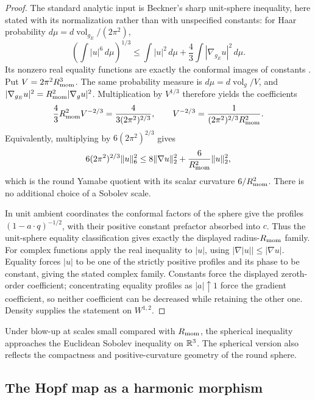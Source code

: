 \documentclass[11pt]{article}
\begin{document}
\begin{proof}
The standard analytic input is Beckner's sharp unit-sphere inequality,
here stated with its normalization rather than with unspecified constants:
for Haar probability \(d\mu=d\operatorname{vol}_{g_E}/(2\pi^2)\),
\[
 \left(\int |u|^6\,d\mu\right)^{1/3}
 \le \int |u|^2\,d\mu
       +\frac43\int |\nabla_{g_E}u|^2\,d\mu.
\]
Its nonzero real equality functions are exactly the conformal images of
constants \cite{beckner1993sharp}.  Put
\(V=2\pi^2R_{\mathrm{mom}}^3\).  The same probability measure is
\(d\mu=d\operatorname{vol}_g/V\), and
\(|\nabla_{g_E}u|^2=R_{\mathrm{mom}}^2|\nabla_gu|^2\).  Multiplication by \(V^{1/3}\)
therefore yields the coefficients
\[
 \frac43R_{\mathrm{mom}}^2V^{-2/3}
 =\frac4{3(2\pi^2)^{2/3}},\qquad
 V^{-2/3}=\frac1{(2\pi^2)^{2/3}R_{\mathrm{mom}}^2}.
\]
Equivalently, multiplying by \(6(2\pi^2)^{2/3}\) gives
\[
 6(2\pi^2)^{2/3}\|u\|_6^2
 \le8\|\nabla u\|_2^2+\frac6{R_{\mathrm{mom}}^2}\|u\|_2^2,
\]
which is the round Yamabe quotient with its scalar curvature \(6/R_{\mathrm{mom}}^2\).
There is no additional choice of a Sobolev scale.

In unit ambient coordinates the conformal factors of the sphere give the
profiles \((1-a\cdot q)^{-1/2}\), with their positive constant prefactor
absorbed into \(c\).  Thus the unit-sphere equality classification gives
exactly the displayed radius-\(R_{\mathrm{mom}}\) family.  For complex functions apply
the real inequality to \(|u|\), using
\(|\nabla|u||\le|\nabla u|\).  Equality forces \(|u|\) to be one of the
strictly positive profiles and its phase to be constant, giving the stated
complex family.  Constants force the displayed zeroth-order coefficient;
concentrating equality profiles as \(|a|\uparrow1\) force the gradient
coefficient, so neither coefficient can be decreased while retaining the
other one.  Density supplies the statement on \(W^{1,2}\).
\end{proof}

\begin{remark}
Under blow-up at scales small compared with \(R_{\mathrm{mom}}\), the spherical inequality approaches the Euclidean Sobolev inequality on \(\mathbb{R}^3\). The spherical version also reflects the compactness and positive-curvature geometry of the round sphere.
\end{remark}


\subsection{The Hopf map as a harmonic morphism}
\label{p1:der:harmonic-morphism}
\end{document}
